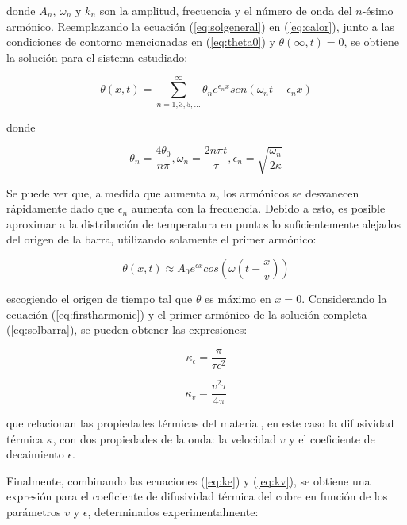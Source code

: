 \documentclass[twoside,twocolumn,a4paper]{article}
\begin{document}
donde $A_{n}$, $\omega_{n}$ y $k_{n}$ son la amplitud, frecuencia y el n\'umero de onda del $n$-\'esimo arm\'onico. Reemplazando la ecuaci\'on (\ref{eq:solgeneral}) en (\ref{eq:calor}), junto a las condiciones de contorno mencionadas en (\ref{eq:theta0}) y $\theta(\infty,t) = 0$, se obtiene la soluci\'on para el sistema estudiado:

\begin{equation}
\label{eq:solbarra}
\theta(x,t) = \sum_{n = 1, 3, 5, ...}^{\infty} \theta_{n}e^{\epsilon_{n}x} sen(\omega_{n}t - \epsilon_{n}x)
\end{equation}

donde

\begin{equation}
\label{eq:conds}
\theta_{n} = \frac{4\theta_{0}}{n\pi}, \omega_{n} = \frac{2n\pi t}{\tau}, \epsilon_{n} = \sqrt{\frac{\omega_{n}}{2\kappa}}
\end{equation}


Se puede ver que, a medida que aumenta $n$, los arm\'onicos se desvanecen r\'apidamente dado que $\epsilon_{n}$ aumenta con la frecuencia. Debido a esto, es posible aproximar a la distribuci\'on de temperatura en puntos lo suficientemente alejados del origen de la barra, utilizando solamente el primer arm\'onico:

\begin{equation}
\label{eq:firstharmonic}
\theta(x,t) \approx A_{0}e^{\epsilon x} cos(\omega(t - \frac{x}{v}))
\end{equation}

escogiendo el origen de tiempo tal que $\theta$ es m\'aximo en $ x = 0$. Considerando la ecuaci\'on (\ref{eq:firstharmonic}) y el primer arm\'onico de la soluci\'on completa (\ref{eq:solbarra}), se pueden obtener las expresiones:

\begin{equation}
\label{eq:ke}
\kappa_{\epsilon} = \frac{\pi}{\tau \epsilon^{2}}
\end{equation}

\begin{equation}
\label{eq:kv}
\kappa_{v} = \frac{v^{2} \tau}{4\pi}
\end{equation}


que relacionan las propiedades t\'ermicas del material, en este caso la difusividad t\'ermica $\kappa$, con dos propiedades de la onda: la velocidad $v$ y el coeficiente de decaimiento $\epsilon$. \newline

\par
Finalmente, combinando las ecuaciones (\ref{eq:ke}) y (\ref{eq:kv}), se obtiene una expresi\'on para el coeficiente de difusividad t\'ermica del cobre en funci\'on de los par\'ametros $v$ y $\epsilon$, determinados experimentalmente:
\end{document}
